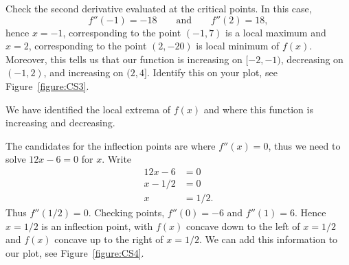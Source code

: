 Check the second derivative evaluated at the critical points. In this
case,
\[
f''(-1) = -18 \qquad\text{and}\qquad f''(2) = 18,
\]
hence $x=-1$, corresponding to the point $(-1,7)$ is a local maximum
and $x=2$, corresponding to the point $(2,-20)$ is local minimum of
$f(x)$. Moreover, this tells us that our function is increasing on
$[-2,-1)$, decreasing on $(-1,2)$, and increasing on $(2,4]$. Identify
this on your plot, see Figure~\ref{figure:CS3}.
\begin{marginfigure}[0in]
\caption{We have identified the local extrema of $f(x)$ and where this
  function is increasing and decreasing.}
\label{figure:CS3}
\end{marginfigure}


The candidates for the inflection points are where $f''(x) = 0$, thus
we need to solve $12x-6=0$ for $x$.  Write
\begin{align*}
12x-6 &=0\\
x - 1/2 &=0\\
x &=1/2.
\end{align*}
Thus $f''(1/2) = 0$. Checking points, $f''(0) = -6$ and $f''(1) = 6$.
Hence $x=1/2$ is an inflection point, with $f(x)$ concave down to the
left of $x=1/2$ and $f(x)$ concave up to the right of $x=1/2$. We can
add this information to our plot, see Figure~\ref{figure:CS4}.

